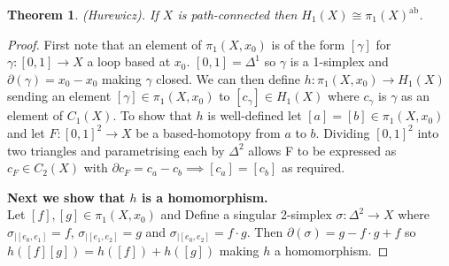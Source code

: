 \documentclass{article}
\newtheorem{theorem}{Theorem}[section]
\begin{document}
\begin{theorem}
(Hurewicz). If $X$ is path-connected then $H_1(X)\cong\pi_1(X)^{\text{ab}}$.
\end{theorem}
\begin{proof}
First note that an element of $\pi_1(X,x_0)$ is of the form $[\gamma]$ for $\gamma\colon [0,1]\to X$ a loop based at $x_0$. $[0,1]=\Delta^1$ so $\gamma$ is a 1-simplex and $\partial(\gamma)=x_0-x_0$ making $\gamma$ closed.
We can then define $h\colon\pi_1(X,x_0)\to H_1(X)$ sending an element $[\gamma]\in\pi_1(X,x_0)$ to $[c_\gamma]\in H_1(X)$ where $c_\gamma$ is $\gamma$ as an element of $C_1(X)$. To show that $h$ is well-defined let $[a]=[b]\in\pi_1(X,x_0)$ and let $F\colon [0,1]^2\to X$ be a based-homotopy from $a$ to $b$. Dividing $[0,1]^2$ into two triangles and parametrising each by $\Delta^2$ allows F to be expressed as $c_F\in C_2(X)$ with $\partial c_F=c_a-c_b\implies [c_a]=[c_b]$ as required.

\noindent \textbf{Next we show that $h$ is a homomorphism.}\\
Let $[f],[g]\in\pi_1(X,x_0)$ and Define a singular 2-simplex $\sigma\colon\Delta^2\to X$ where $\sigma_{|[e_0,e_1]}=f$, $\sigma_{|[e_1,e_2]}=g$ and $\sigma_{|[e_0,e_2]}=f\cdot g$. Then $\partial(\sigma)=g-f\cdot g+f$ so $h([f][g])=h([f])+h([g])$ making $h$ a homomorphism.


\end{proof}
\end{document}
